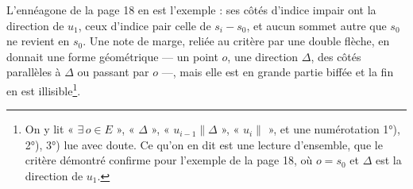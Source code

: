\documentclass[11pt,a4paper]{article}
\begin{document}
L'ennéagone de la page 18 en est l'exemple : ses côtés d'indice impair ont la
direction de $u_1$, ceux d'indice pair celle de $s_i - s_0$, et aucun sommet
autre que $s_0$ ne revient en $s_0$. Une note de marge, reliée au critère par
une double flèche, en donnait une forme géométrique --- un point $o$, une
direction $\Delta$, des côtés parallèles à $\Delta$ ou passant par $o$ ---,
mais elle est en grande partie biffée et la fin en est
illisible\footnote{On y lit « $\exists\, o \in E$ », « $\Delta$ »,
« $u_{i-1} \parallel \Delta$ », « $u_i \parallel$ », et une numérotation
1°), 2°), 3°) lue avec doute. Ce qu'on en dit est une lecture d'ensemble, que
le critère démontré confirme pour l'exemple de la page 18, où $o = s_0$ et
$\Delta$ est la direction de $u_1$.}.
\end{document}
